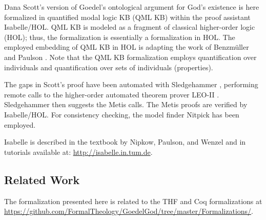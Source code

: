 %
\begin{isabellebody}%
\def\isabellecontext{GoedelGod}%
%
\isadelimtheory
%
\endisadelimtheory
%
\isatagtheory
%
\endisatagtheory
{\isafoldtheory}%
%
\isadelimtheory
%
\endisadelimtheory
%
\isamarkuptrue%
%
\begin{isamarkuptext}%
Dana Scott's version \cite{ScottNotes}
 of Goedel's ontological argument \cite{GoedelNotes} for God's existence is here
 formalized in quantified modal logic KB (QML KB) within the proof assistant Isabelle/HOL. 
 QML KB is  modeled as a fragment of classical higher-order logic (HOL); 
 thus, the formalization is essentially a formalization in HOL. The employed embedding 
 of QML KB in HOL is adapting the work of Benzm\"uller and Paulson \cite{J23,B9}.
 Note that the QML KB formalization employs quantification over individuals and 
 quantification over sets of individuals (properties).

 The gaps in Scott's proof have been automated 
 with Sledgehammer \cite{Sledgehammer}, performing remote calls to the higher-order automated
 theorem prover LEO-II \cite{LEO-II}. Sledgehammer then suggests the 
 Metis \cite{Metis} calls. The Metis proofs are verified by Isabelle/HOL.
 For consistency checking, the model finder Nitpick \cite{Nitpick} has been employed.
 
 Isabelle is described in the textbook by Nipkow, 
 Paulson, and Wenzel \cite{Isabelle} and in tutorials available 
 at: \url{http://isabelle.in.tum.de}.
 
\subsection{Related Work}

 The formalization presented here is related to the THF \cite{J22} and 
 Coq \cite{Coq} formalizations at 
 \url{https://github.com/FormalTheology/GoedelGod/tree/master/Formalizations/}.
 

\end{isamarkuptext}
\end{isabellebody}
